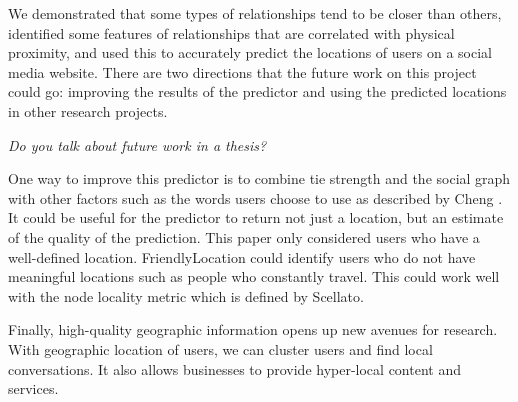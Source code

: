We demonstrated that some types of relationships tend to be closer than others,
identified some features of relationships that are correlated with physical
proximity, and used this to accurately predict the locations of users on a
social media website.
There are two directions that the future work on this project could go:
improving the results of the predictor and using the predicted locations in
other research projects.

\emph{Do you talk about future work in a thesis?}

One way to improve this predictor is to combine tie strength and the social
graph with other factors such as the words users choose to use as described by
Cheng \cite{cheng2010you}.
It could be useful for the predictor to return not just a location, but an
estimate of the quality of the prediction.  This paper only considered
users who have a well-defined location. FriendlyLocation could identify users
who do not have meaningful locations such as people who constantly travel.
This could work well with the node locality metric which is defined by
Scellato\cite{scellato2010distance}.

Finally, high-quality geographic information opens up new avenues for research.
With geographic location of users, we can cluster users and find local
conversations.
It also allows businesses to provide hyper-local content and services.


